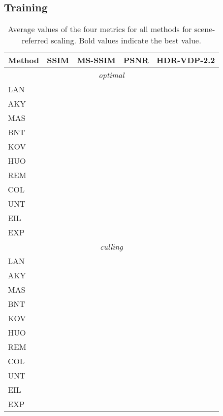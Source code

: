 \documentclass{egpubl}
\newcommand\la[1]{\multicolumn{1}{l}{#1}}
\begin{document}
\subsection{\textbf{Training}}

\begin{table}[tbp]
    \caption{Average values of the four metrics for all methods for
    scene-referred scaling. Bold values indicate the best
    value.}\label{table:resultsscene}
    \centering
    \begin{tabular}{lcccc}
        \toprule
        \la{{Method}}&SSIM&MS-SSIM&PSNR&HDR-VDP-2.2\\\midrule
        \multicolumn{5}{c}{\textit{optimal}} \\\midrule
\la{LAN}&&&&\\
        \la{AKY}&&&&\\
        \la{MAS}&&&&\\
        \la{BNT}&&&&\\
        \la{KOV}&&&&\\
        \la{HUO}&&&&\\
        \la{REM}&&&&\\
        \la{COL}&&&&\\
        \la{UNT}&&&&\\
        \la{EIL}&&&&\\
        \la{EXP}&&&&\\\midrule
\multicolumn{5}{c}{\textit{culling}} \\\midrule
        \la{LAN}&&&&\\
\la{AKY}&&&&\\
        \la{MAS}&&&&\\
        \la{BNT}&&&&\\
        \la{KOV}&&&&\\
        \la{HUO}&&&&\\
        \la{REM}&&&&\\
        \la{COL}&&&&\\
        \la{UNT}&&&&\\
        \la{EIL}&&&&\\
        \la{EXP}&&&&\\
        \bottomrule
    \end{tabular}
\end{table}
\end{document}
